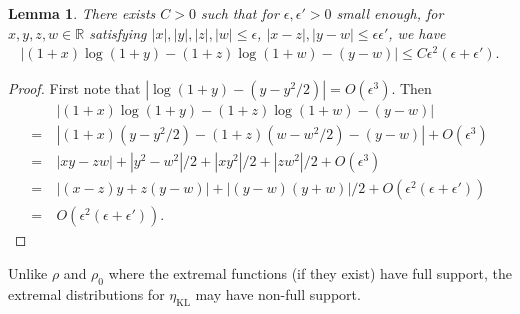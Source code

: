 \documentclass[11pt]{article}
\def\bR{\mathbb{R}}
\DeclareMathOperator\KL{\mathrm{KL}}
\newcommand{\nbyp}[1]{{\color{red}[Yury: #1]}}
\newtheorem{lemma}[theorem]{Lemma}
\theoremstyle{definition}
\begin{document}
\begin{lemma} \label{lem:lem-extremal-eta-KL:helper}
  There exists $C>0$ such that for $\epsilon, \epsilon'>0$ small enough, for $x,y,z,w\in \bR$ satisfying $|x|,|y|,|z|,|w|\le \epsilon$, $|x-z|,|y-w|\le \epsilon\epsilon'$, we have
  \begin{align}
      |(1+x)\log(1+y)-(1+z)\log(1+w) - (y-w)| \le C \epsilon^2 (\epsilon+\epsilon').
  \end{align}
\end{lemma}
\begin{proof}
  First note that $|\log(1+y)-(y-y^2/2)| = O(\epsilon^3)$.
  Then
  \begin{align}
  &~ |(1+x)\log(1+y)-(1+z)\log(1+w) - (y-w)| \\
  \nonumber =&~ |(1+x)(y-y^2/2) - (1+z) (w-w^2/2) - (y-w)| + O(\epsilon^3) \\
  \nonumber =&~ |xy-zw| + |y^2-w^2|/2 + |xy^2|/2 + |zw^2|/2+ O(\epsilon^3) \\
  \nonumber =&~ |(x-z)y + z(y-w)| + |(y-w)(y+w)|/2 + O(\epsilon^2(\epsilon+\epsilon')) \\
  \nonumber =&~ O(\epsilon^2(\epsilon+\epsilon')).
  \end{align}
\end{proof}


Unlike $\rho$ and $\rho_0$ where the extremal functions (if they exist) have full support, the extremal distributions for $\eta_{\KL}$ may have non-full support. %
\end{document}
